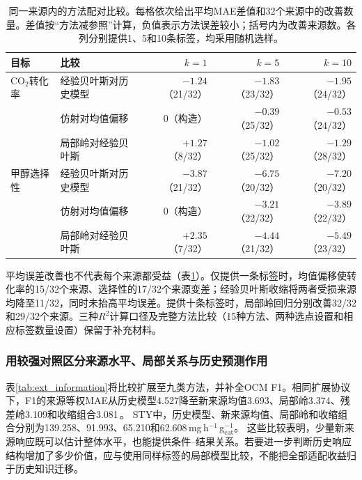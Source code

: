\documentclass[11pt,a4paper]{article}
\newcommand{\pp}{\,\text{个百分点}}
\newcommand{\mgg}{\,mg\,h$^{-1}$\,g$_{\mathrm{cat}}^{-1}$}
\begin{document}
\begin{table}[t]
\centering\small
\caption{同一来源内的方法配对比较。每格依次给出平均MAE差值和32个来源中的改善数量。差值按“方法减参照”计算，负值表示方法误差较小；括号内为改善来源数。各列分别提供1、5和10条标签，均采用随机选样。}
\label{tab:paired}
\begin{tabular}{llrrr}
\toprule
目标 & 比较 & $k=1$ & $k=5$ & $k=10$ \\
\midrule
CO$_2$转化率 & 经验贝叶斯对历史模型 & $-1.24$（21/32） & $-1.83$（23/32） & $-1.95$（24/32） \\
 & 仿射对均值偏移 & 0（构造） & $-0.39$（25/32） & $-0.53$（24/32） \\
 & 局部岭对经验贝叶斯 & $+1.27$（8/32） & $-1.02$（25/32） & $-1.29$（28/32） \\
\midrule
甲醇选择性 & 经验贝叶斯对历史模型 & $-3.87$（21/32） & $-6.75$（20/32） & $-7.20$（20/32） \\
 & 仿射对均值偏移 & 0（构造） & $-3.21$（22/32） & $-3.89$（22/32） \\
 & 局部岭对经验贝叶斯 & $+2.35$（7/32） & $-4.44$（21/32） & $-5.49$（23/32） \\
\bottomrule
\end{tabular}
\end{table}
平均误差改善也不代表每个来源都受益（表\ref{tab:paired}）。仅提供一条标签时，均值偏移使转化率的15/32个来源、选择性的17/32个来源变差；经验贝叶斯收缩将两者受损来源均降至11/32，同时未抬高平均误差。提供十条标签时，局部岭回归分别改善32/32和29/32个来源。三种$R^2$计算口径及完整方法比较（15种方法、两种选点设置和相应标签数量设置）保留于补充材料。

\subsubsection{用较强对照区分来源水平、局部关系与历史预测作用}
表\ref{tab:ext_information}将比较扩展至九类方法，并补全OCM F1。相同扩展协议下，F1的来源等权MAE从历史模型4.527降至新来源均值3.693、局部岭3.374、残差岭3.109和收缩组合3.081\pp{}。
STY中，历史模型、新来源均值、局部岭和收缩组合分别为139.258、91.993、65.210和62.608\mgg{}。
这些比较表明，少量新来源响应既可以估计整体水平，也能提供条件--结果关系。若要进一步判断历史响应结构增加了多少价值，应与使用同样标签的局部模型比较，不能把全部适配收益归于历史知识迁移。
\begin{table}[htbp]\centering\footnotesize
\setlength{\tabcolsep}{4pt}
\caption{扩展预测方法比较：随机提供五条标签。每项任务内，各方法共享支持记录和测试记录。本表采用扩展分析中预先固定的模型与支持顺序，应在表内比较；不与表\ref{tab:k5}跨表相减计算收益。STY使用原始物理单位，其余为百分点。}\label{tab:ext_information}

\end{table}
\end{document}

